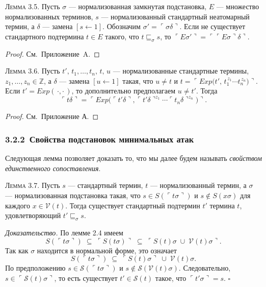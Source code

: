 \textsc{Лемма 3.5.} 
Пусть $\sigma$ — нормализованная замкнутая подстановка,
$E$ — множество нормализованных терминов,
$s$ — нормализованный стандартный неатомарный термин,
а $\delta$ — замена $[s \leftarrow 1]$.
Обозначим $\sigma'=\ulcorner\sigma\delta\urcorner$.
Если не существует стандартного подтермина $t\in E$ такого, что  
$t\sqsubseteq_{\sigma}s$, то $\ulcorner E\sigma'\urcorner = \ulcorner\ulcorner E\sigma\urcorner\delta\urcorner$.

\begin{proof}
  См.\ Приложение~A.
\end{proof}

\medskip

\textsc{Лемма 3.6.} 
Пусть $t',\,t_1,\dots,t_n,\,t,\,u$ — нормализованные стандартные термины,
$z_1,\dots,z_n\in\mathbb Z$, а $\delta$ — замена $[u\leftarrow1]$ такая, что
$u\neq t$ и $t=\ulcorner Exp\bigl(t',\,t_1^{\,z_1}\!\cdots t_n^{\,z_n}\bigr)\urcorner$.
Если $t'=Exp(\,\cdot,\cdot\,)$, то дополнительно предполагаем
$u\neq t'$. Тогда
\[
  \ulcorner t\delta\urcorner
  =\ulcorner Exp\bigl(\ulcorner t'\delta\urcorner,
        \ulcorner t'\delta\urcorner^{z_1}\!\cdots \ulcorner t_n\delta\urcorner^{z_n}\bigr)\urcorner.
\]

\begin{proof}
  См.\ Приложение А.
\end{proof}

\subsubsection*{3.2.2 \,Свойства подстановок минимальных атак}
Следующая лемма позволяет доказать то, что мы далее будем
называть \emph{свойством единственного сопоставления}.

\textsc{Лемма 3.7.}
Пусть $s$ — стандартный термин, $t$ — нормализованный термин,
а $\sigma$ — нормализованная подстановка такая, что
$s\in S(\ulcorner t\sigma\urcorner)$ и
$s\notin S(x\sigma)$ для каждого $x\in\mathcal V(t)$.
Тогда существует стандартный подтермин $t'$ термина $t$,
удовлетворяющий $t'\sqsubseteq_{\sigma}s$.

\textit{Доказательство.}
По лемме 2.4 имеем
\[
  S(\ulcorner t\sigma\urcorner)\;\subseteq\;
  \ulcorner S(t\sigma)\urcorner
  \;\subseteq\;
  \ulcorner S(t)\sigma\;\cup\;\mathcal V(t)\sigma\urcorner.
\]
Так как $\sigma$ находится в нормальной форме, это означает
\[
  S(\ulcorner t\sigma\urcorner)\;\subseteq\;
  \ulcorner S(t)\sigma\urcorner\;\cup\;\mathcal V(t)\sigma.
\]
По предположению $s\in \mathcal S(\ulcorner t\sigma\urcorner)$ и
$s\notin \mathcal S(\mathcal V(t)\sigma)$.
Следовательно, $s\in\ulcorner \mathcal S(t)\sigma\urcorner$,
то есть существует $t'\in \mathcal S(t)$ такое, что
$\ulcorner t'\sigma\urcorner = s$.
\hfill$\square$

